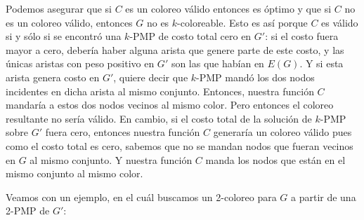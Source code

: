 \documentclass[11pt, a4paper, twoside]{article}
\begin{document}
\begin{enumerate}
				  Podemos asegurar que si $C$ es un coloreo válido entonces es óptimo y que si $C$ no es un coloreo válido,
				  entonces $G$ no es $k$-coloreable. Esto es así porque $C$ es válido si y sólo si se encontró una $k$-PMP de costo
				  total cero en $G'$: si el costo fuera mayor a cero, debería haber alguna arista que genere parte de este costo, y 
				  las únicas aristas con peso positivo en $G'$ son las que habían en $E(G)$. Y si esta arista genera costo en $G'$, 
				  quiere decir que $k$-PMP mandó los dos nodos incidentes en dicha arista al mismo conjunto. Entonces, nuestra función
				  $C$ mandaría a estos dos nodos vecinos al mismo color. Pero entonces el coloreo resultante no sería válido. En cambio,
				  si el costo total de la solución de $k$-PMP sobre $G'$ fuera cero, entonces nuestra función $C$ generaría un coloreo
				  válido pues como el costo total es cero, sabemos que no se mandan nodos que fueran vecinos en $G$ al mismo conjunto.
				  Y nuestra función $C$ manda los nodos que están en el mismo conjunto al mismo color.
				  
				  Veamos con un ejemplo, en el cuál buscamos un 2-coloreo para $G$ a partir de una 2-PMP de $G'$:
				  

\end{enumerate}
\end{document}
